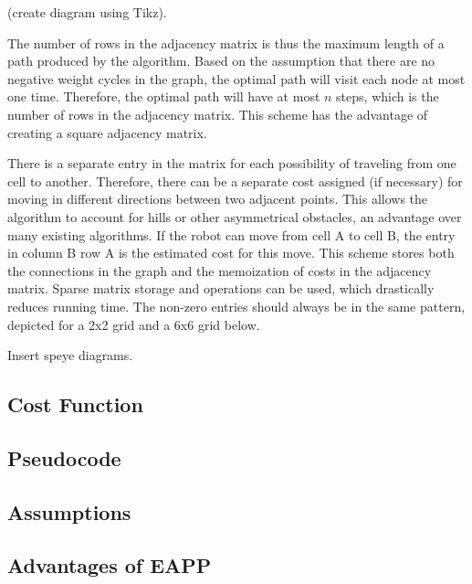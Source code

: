 \documentclass[journal]{IEEEtran}
\begin{document}
(create diagram using Tikz).
  
The number of rows in the adjacency matrix is thus the maximum length of a path produced by the algorithm.
Based on the assumption that there are no negative weight cycles in the graph, the optimal path will visit each node at most one time.
Therefore, the optimal path will have at most $n$ steps, which is the number of rows in the adjacency matrix. 
This scheme has the advantage of creating a square adjacency matrix.

There is a separate entry in the matrix for each possibility of traveling from one cell to another.
Therefore, there can be a separate cost assigned (if necessary) for moving in different directions between  two adjacent points. 
This allows the algorithm to account for hills or other asymmetrical obstacles, an advantage over many existing algorithms.
If the robot can move from cell A to cell B, the entry in column B row A is the estimated cost for this move. 
This scheme stores both the connections in the graph and the memoization of costs in the adjacency matrix. 
Sparse matrix storage and operations can be used, which drastically reduces running time.
The non-zero entries should always be in the same pattern, depicted for a 2x2 grid and a 6x6 grid below. 

Insert speye diagrams.  

\subsection{Cost Function}

\subsection{Pseudocode}

\subsection{Assumptions}

\subsection{Advantages of EAPP}

\end{document}
